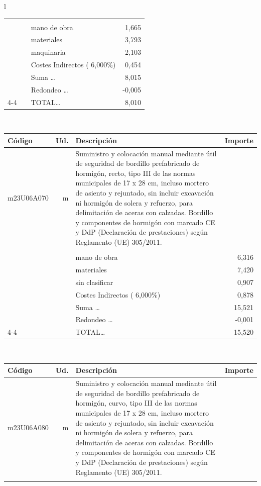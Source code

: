 \documentclass{book}%
\begin{document}
\begin{longtable}{l}
\begin{tabular}{l r p{60mm} r}
&&&\\%
&&mano de obra&     1,665\\%
&&materiales&     3,793\\%
&&maquinaria&     2,103\\%
&&Costes Indirectos (     6,000\%)&     0,454\\%
&&Suma \ldots&     8,015\\%
&&Redondeo \ldots&    {-}0,005\\%
\cline{4-4}%
&&TOTAL\ldots&     8,010\\%
\end{tabular}\\%
\begin{tabular}{l r p{60mm} r}%
Código&Ud.&Descripción&Importe\\%
\hline%
m23U06A070&m&Suministro y colocación manual mediante útil de seguridad de bordillo prefabricado de hormigón, recto, tipo III de las normas municipales de 17 x 28 cm, incluso mortero de asiento y rejuntado, sin incluir excavación ni hormigón de solera y refuerzo, para delimitación de aceras con calzadas. Bordillo y componentes de hormigón con marcado CE y DdP (Declaración de prestaciones) según Reglamento (UE) 305/2011.&\\%
&&&\\%
&&mano de obra&     6,316\\%
&&materiales&     7,420\\%
&&sin clasificar&     0,907\\%
&&Costes Indirectos (     6,000\%)&     0,878\\%
&&Suma \ldots&    15,521\\%
&&Redondeo \ldots&    {-}0,001\\%
\cline{4-4}%
&&TOTAL\ldots&    15,520\\%
\end{tabular}\\%
\begin{tabular}{l r p{60mm} r}%
Código&Ud.&Descripción&Importe\\%
\hline%
m23U06A080&m&Suministro y colocación manual mediante útil de seguridad de bordillo prefabricado de hormigón, curvo, tipo III de las normas municipales de 17 x 28 cm, incluso mortero de asiento y rejuntado, sin incluir excavación ni hormigón de solera y refuerzo, para delimitación de aceras con calzadas. Bordillo y componentes de hormigón con marcado CE y DdP (Declaración de prestaciones) según Reglamento (UE) 305/2011.&\\%
&&&\\%

\end{tabular}
\end{longtable}
\end{document}

